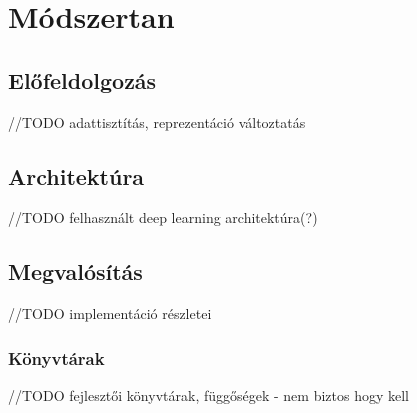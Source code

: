 \chapter{Módszertan} 
\label{ch:methodology}

\section{Előfeldolgozás}

//TODO adattisztítás, reprezentáció változtatás

\section{Architektúra}

//TODO felhasznált deep learning architektúra(?)

\section{Megvalósítás}

//TODO implementáció részletei

\subsection{Könyvtárak}

//TODO fejlesztői könyvtárak, függőségek - nem biztos hogy kell